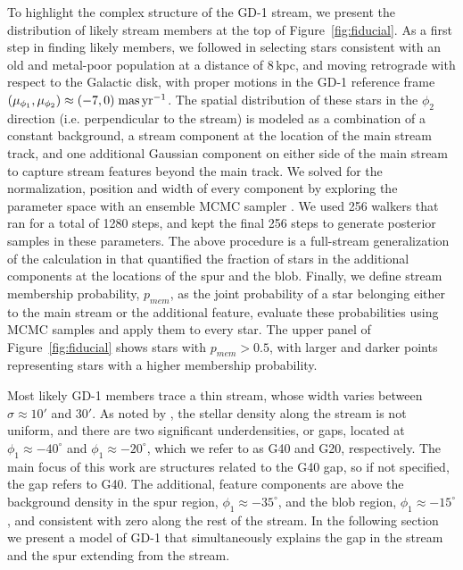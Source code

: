 \documentclass[twocolumn]{aastex62}
\begin{document}
To highlight the complex structure of the GD-1 stream, we present the distribution of likely stream members at the top of Figure~\ref{fig:fiducial}.
As a first step in finding likely members, we followed \citet{pwb} in selecting stars consistent with an old and metal-poor population at a distance of 8\,kpc, and moving retrograde with respect to the Galactic disk, with proper motions in the GD-1 reference frame $(\mu_{\phi_1}, \mu_{\phi_2})\approx(-7,0)\;\rm mas\,yr^{-1}$.
The spatial distribution of these stars in the $\phi_2$ direction (i.e. perpendicular to the stream) is modeled as a combination of a constant background, a stream component at the location of the main stream track, and one additional Gaussian component on either side of the main stream to capture stream features beyond the main track.
We solved for the normalization, position and width of every component by exploring the parameter space with an ensemble MCMC sampler \citep{Foreman-Mackey:2013}.
We used 256 walkers that ran for a total of 1280 steps, and kept the final 256 steps to generate posterior samples in these parameters.
The above procedure is a full-stream generalization of the calculation in \citep{pwb} that quantified the fraction of stars in the additional components at the locations of the spur and the blob.
Finally, we define stream membership probability, $p_{mem}$, as the joint probability of a star belonging either to the main stream or the additional feature, evaluate these probabilities using MCMC samples and apply them to every star.
The upper panel of Figure~\ref{fig:fiducial} shows stars with $p_{mem}>0.5$, with larger and darker points representing stars with a higher membership probability.

Most likely GD-1 members trace a thin stream, whose width varies between $\sigma\approx10'$ and $30'$.
As noted by \citet{pwb}, the stellar density along the stream is not uniform, and there are two significant underdensities, or gaps, located at $\phi_1\approx-40^\circ$ and $\phi_1\approx-20^\circ$, which we refer to as G40 and G20, respectively.
The main focus of this work are structures related to the G40 gap, so if not specified, the gap refers to G40.
The additional, feature components are above the background density in the spur region, $\phi_1\approx-35^\circ$, and the blob region, $\phi_1\approx-15^\circ$, and consistent with zero along the rest of the stream.
In the following section we present a model of GD-1 that simultaneously explains the gap in the stream and the spur extending from the stream.
\end{document}
